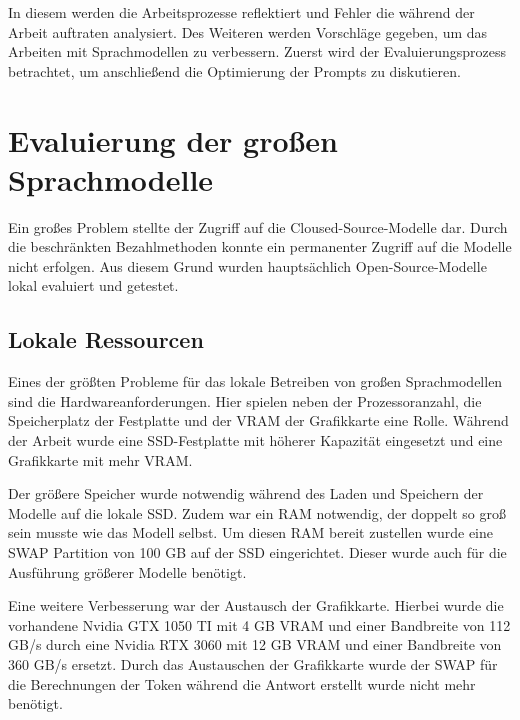 In diesem werden die Arbeitsprozesse reflektiert und Fehler die während der Arbeit auftraten analysiert. Des Weiteren werden Vorschläge gegeben, um das Arbeiten mit Sprachmodellen zu verbessern. Zuerst wird der Evaluierungsprozess betrachtet, um anschließend die Optimierung der Prompts zu diskutieren.




\section{Evaluierung der großen Sprachmodelle}
Ein großes Problem stellte der Zugriff auf die Cloused-Source-Modelle dar. Durch die beschränkten Bezahlmethoden konnte ein permanenter Zugriff auf die Modelle nicht erfolgen. Aus diesem Grund wurden hauptsächlich Open-Source-Modelle lokal evaluiert und getestet.


\subsection{Lokale Ressourcen}
Eines der größten Probleme für das lokale Betreiben von großen Sprachmodellen sind die Hardwareanforderungen. Hier spielen neben der Prozessoranzahl, die Speicherplatz der Festplatte und der VRAM der Grafikkarte eine Rolle. Während der Arbeit wurde eine SSD-Festplatte mit höherer Kapazität eingesetzt und eine Grafikkarte mit mehr VRAM.\vspace{0.2cm}

Der größere Speicher wurde notwendig während des Laden und Speichern der Modelle auf die lokale SSD. Zudem war ein RAM notwendig, der doppelt so groß sein musste wie das Modell selbst. Um diesen RAM bereit zustellen wurde eine SWAP Partition von 100 GB auf der SSD eingerichtet. Dieser wurde auch für die Ausführung größerer Modelle benötigt.\vspace{0.2cm}

Eine weitere Verbesserung war der Austausch der Grafikkarte. Hierbei wurde die vorhandene Nvidia GTX 1050 TI mit 4 GB VRAM und einer Bandbreite von 112 GB/s durch eine Nvidia RTX 3060 mit 12 GB VRAM und einer Bandbreite von 360 GB/s ersetzt. Durch das Austauschen der Grafikkarte wurde der SWAP für die Berechnungen der Token während die Antwort erstellt wurde nicht mehr benötigt.


